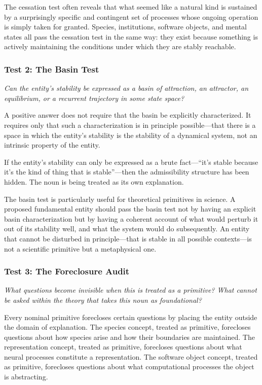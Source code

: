 \documentclass[12pt, a4paper]{article}
\theoremstyle{plain}
\theoremstyle{definition}
\theoremstyle{remark}
\begin{document}
The cessation test often reveals that what seemed like a natural kind is
sustained by a surprisingly specific and contingent set of processes whose
ongoing operation is simply taken for granted. Species, institutions,
software objects, and mental states all pass the cessation test in the same
way: they exist because something is actively maintaining the conditions
under which they are stably reachable.

\subsubsection*{Test 2: The Basin Test}

\textit{Can the entity's stability be expressed as a basin of attraction,
an attractor, an equilibrium, or a recurrent trajectory in some state space?}

A positive answer does not require that the basin be explicitly characterized.
It requires only that such a characterization is in principle possible---that
there is a space in which the entity's stability is the stability of a
dynamical system, not an intrinsic property of the entity.

If the entity's stability can only be expressed as a brute fact---``it's
stable because it's the kind of thing that is stable''---then the
admissibility structure has been hidden. The noun is being treated as its
own explanation.

The basin test is particularly useful for theoretical primitives in science.
A proposed fundamental entity should pass the basin test not by having an
explicit basin characterization but by having a coherent account of what
would perturb it out of its stability well, and what the system would do
subsequently. An entity that cannot be disturbed in principle---that is
stable in all possible contexts---is not a scientific primitive but a
metaphysical one.

\subsubsection*{Test 3: The Foreclosure Audit}

\textit{What questions become invisible when this is treated as a primitive?
What cannot be asked within the theory that takes this noun as foundational?}

Every nominal primitive forecloses certain questions by placing the entity
outside the domain of explanation. The species concept, treated as primitive,
forecloses questions about how species arise and how their boundaries are
maintained. The representation concept, treated as primitive, forecloses
questions about what neural processes constitute a representation. The
software object concept, treated as primitive, forecloses questions about
what computational processes the object is abstracting.
\end{document}
